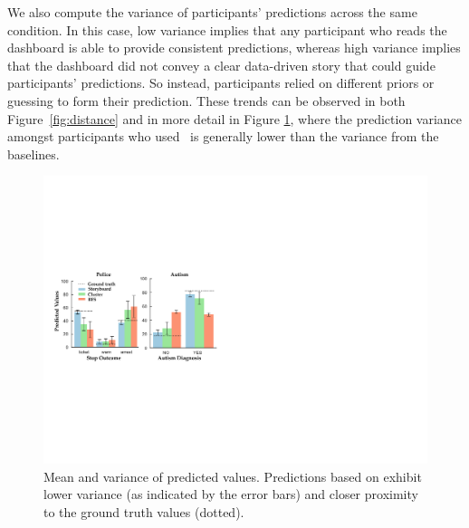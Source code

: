 \par We also compute the variance of participants' predictions across the same condition. In this case, low variance implies that any participant who reads the dashboard is able to provide consistent predictions, whereas high variance implies that the dashboard did not convey a clear data-driven story that could guide participants' predictions. So instead, participants relied on different priors or guessing to form their prediction. These trends can be observed in both Figure~\ref{fig:distance} and in more detail in Figure \ref{fig:actual_predictions}, where the prediction variance amongst participants who used \system\ is generally lower than the variance from the baselines.
\begin{figure}[h!]
\centering
\includegraphics[width=0.85\linewidth]{figures/prediction.pdf}
\caption{Mean and variance of predicted values. Predictions based on \system exhibit lower variance (as indicated by the error bars) and closer proximity to the ground truth values (dotted).}
\label{fig:actual_predictions}
\vspace{-15pt}
\end{figure}
